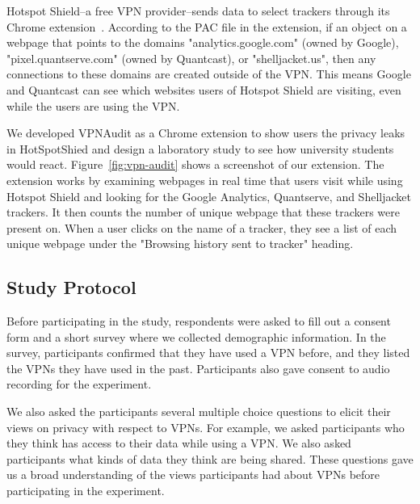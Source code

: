 Hotspot Shield--a free VPN provider--sends data to select trackers through its Chrome extension~\cite{windscribe-hotspot-shield}.  According to the PAC  file in the extension, if an object on a webpage that points to the domains "analytics.google.com" (owned by Google), "pixel.quantserve.com" (owned by Quantcast), or "shelljacket.us", then any connections to these domains are created outside of the VPN.
 
This means Google and Quantcast can see which websites users of Hotspot Shield are visiting, even while the users are using the VPN. 

We developed VPNAudit as a Chrome extension to show users the privacy leaks in HotSpotShied and design a laboratory study to see how university students would react.
Figure~\ref{fig:vpn-audit} shows a screenshot of our extension.
The extension works by examining webpages in real time that users visit while using Hotspot Shield and looking for the Google Analytics, Quantserve, and Shelljacket trackers.
It then counts the number of unique webpage that these trackers were present on.
When a user clicks on the name of a tracker, they see a list of each unique webpage under the "Browsing history sent to tracker" heading. 


\subsection{Study Protocol} 
Before participating in the study, respondents were asked to fill out a consent form and a short survey where we collected demographic information.
In the survey, participants confirmed that they have used a VPN before, and they listed the VPNs they have used in the past.
Participants also gave consent to audio recording for the experiment.

We also asked the participants several multiple choice questions to elicit their views on privacy with respect to VPNs.
For example, we asked participants who they think has access to their data while using a VPN.
We also asked participants what kinds of data they think are being shared.
These questions gave us a broad understanding of the views participants had about VPNs before participating in the experiment.


